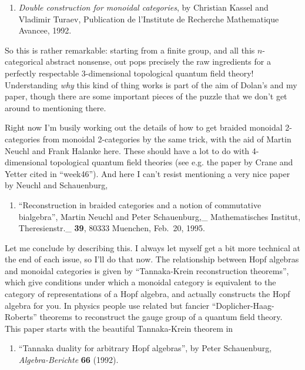 \documentclass{article}
\def\tightlist{}
\begin{document}
\begin{enumerate}
\def\labelenumi{\arabic{enumi})}
\setcounter{enumi}{2}
\tightlist
\item
  \emph{Double construction for monoidal categories}, by Christian
  Kassel and Vladimir Turaev, Publication de l'Institute de Recherche
  Mathematique Avancee, 1992.
\end{enumerate}

So this is rather remarkable: starting from a finite group, and all this
\(n\)-categorical abstract nonsense, out pops precisely the raw
ingredients for a perfectly respectable 3-dimensional topological
quantum field theory! Understanding \emph{why} this kind of thing works
is part of the aim of Dolan's and my paper, though there are some
important pieces of the puzzle that we don't get around to mentioning
there.

Right now I'm busily working out the details of how to get braided
monoidal 2-categories from monoidal 2-categories by the same trick, with
the aid of Martin Neuchl and Frank Halanke here. These should have a lot
to do with 4-dimensional topological quantum field theories (see e.g.
the paper by Crane and Yetter cited in ``week46''). And here I can't
resist mentioning a very nice paper by Neuchl and Schauenburg,

\begin{enumerate}
\def\labelenumi{\arabic{enumi})}
\setcounter{enumi}{3}
\tightlist
\item
  ``Reconstruction in braided categories and a notion of commutative
  bialgebra'', Martin Neuchl and Peter Schauenburg,\_ Mathematisches
  Institut, Theresienstr.\_ \textbf{39}, 80333 Muenchen, Feb.~20, 1995.
\end{enumerate}

Let me conclude by describing this. I always let myself get a bit more
technical at the end of each issue, so I'll do that now. The
relationship between Hopf algebras and monoidal categories is given by
``Tannaka-Krein reconstruction theorems'', which give conditions under
which a monoidal category is equivalent to the category of
representations of a Hopf algebra, and actually constructs the Hopf
algebra for you. In physics people use related but fancier
``Doplicher-Haag-Roberts'' theorems to reconstruct the gauge group of a
quantum field theory. This paper starts with the beautiful Tannaka-Krein
theorem in

\begin{enumerate}
\def\labelenumi{\arabic{enumi})}
\setcounter{enumi}{4}
\tightlist
\item
  ``Tannaka duality for arbitrary Hopf algebras'', by Peter Schauenburg,
  \emph{Algebra-Berichte} \textbf{66} (1992).
\end{enumerate}
\end{document}
